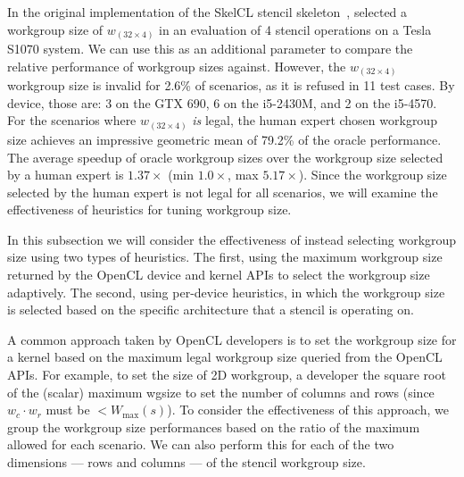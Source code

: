 \documentclass[nonatbib,preprint,9pt]{sigplanconf}
\begin{document}
In the original implementation of the SkelCL stencil
skeleton~\cite{Breuer2013}, \citeauthor{Breuer2013} selected a
workgroup size of $w_{(32 \times 4)}$ in an evaluation of 4 stencil
operations on a Tesla S1070 system. We can use this as an additional
parameter to compare the relative performance of workgroup sizes
against. However, the $w_{(32 \times 4)}$ workgroup size is invalid
for 2.6\% of scenarios, as it is refused in 11 test cases. By device,
those are: 3 on the GTX 690, 6 on the i5-2430M, and 2 on the i5-4570.
For the scenarios where $w_{(32 \times 4)}$ \emph{is} legal, the human
expert chosen workgroup size achieves an impressive geometric mean of
79.2\% of the oracle performance. The average speedup of oracle
workgroup sizes over the workgroup size selected by a human expert is
$1.37\times$ (min $1.0\times$, max $5.17\times$). Since the workgroup
size selected by the human expert is not legal for all scenarios, we
will examine the effectiveness of heuristics for tuning workgroup
size.


In this subsection we will consider the effectiveness of instead
selecting workgroup size using two types of heuristics. The first,
using the maximum workgroup size returned by the OpenCL device and
kernel APIs to select the workgroup size adaptively. The second, using
per-device heuristics, in which the workgroup size is selected based
on the specific architecture that a stencil is operating on.


A common approach taken by OpenCL developers is to set the workgroup
size for a kernel based on the maximum legal workgroup size queried
from the OpenCL APIs. For example, to set the size of 2D workgroup, a
developer the square root of the (scalar) maximum wgsize to set the
number of columns and rows (since $w_c \cdot w_r$ must be
$< W_{\max}(s)$). To consider the effectiveness of this approach, we
group the workgroup size performances based on the ratio of the
maximum allowed for each scenario. We can also perform this for each
of the two dimensions --- rows and columns --- of the stencil
workgroup size.
\end{document}
